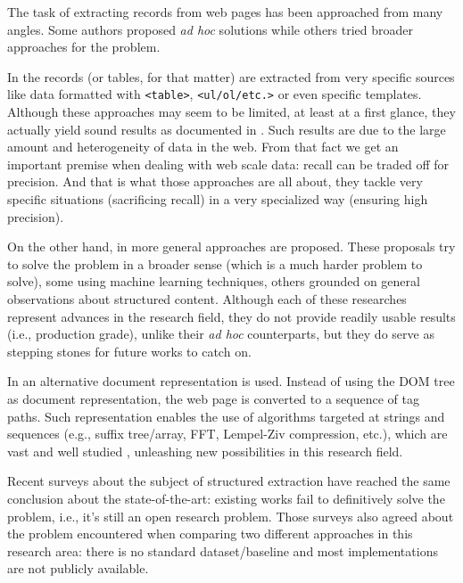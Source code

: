 \documentclass{vldb}
\begin{document}
The task of extracting records from web pages has been approached from many
angles. Some authors proposed \textit{ad hoc} solutions while others tried 
broader approaches for the problem.

In \cite{webtables2008, listExtract2009, tablesMS2012, tegra2015, topklists2013}
the records (or tables, for that matter) are extracted from very specific
sources like data formatted with \texttt{<table>}, \texttt{<ul/ol/etc.>} or even
specific templates. Although these approaches may seem to be limited, at least
at a first glance, they actually yield sound results as documented in
\cite{relationalWeb2008, probase, probase2012, acsdb}. Such results are due to
the large amount and heterogeneity of data in the web. From that fact we get an
important premise when dealing with web scale data: recall can be traded off for
precision. And that is what those approaches are all about, they tackle very
specific situations (sacrificing recall) in a very specialized way (ensuring
high precision).

On the other hand, in \cite{RRunner01, exalg2003, vips03, viper05, MDR03,
depta05, NET05, TPC09, vide10, gstm2010, fivatech2010, cvts2012, SuffixTree12,
clustVX2014, datapath2015, autorm2015} more general approaches are proposed.
These proposals try to solve the problem in a broader sense (which is a much
harder problem to solve), some using machine learning techniques, others
grounded on general observations about structured content. Although each of
these researches represent advances in the research field, they do not provide
readily usable results (i.e., production grade), unlike their \textit{ad hoc}
counterparts, but they do serve as stepping stones for future works to catch
on.

In \cite{TPC09, SuffixTree12, TPS2013} an alternative document representation is
used. Instead of using the DOM tree as document representation, the web page
is converted to a sequence of tag paths. Such representation enables the use of
algorithms targeted at strings and sequences (e.g., suffix
tree/array\cite{ukkonen1995, manber1993suffix}, FFT\cite{fft1965}, Lempel-Ziv
compression\cite{ziv1977universal}, etc.), which are vast and well studied
\cite{gusfield1997algorithms}, unleashing new possibilities in this research
field.

Recent surveys\cite{survey2013, survey2014} about the subject of structured
extraction have reached the same conclusion about the state-of-the-art: existing
works fail to definitively solve the problem, i.e., it's still an open research
problem. Those surveys also agreed about the problem encountered when comparing
two different approaches in this research area: there is no standard
dataset/baseline and most implementations are not publicly available.
\end{document}
